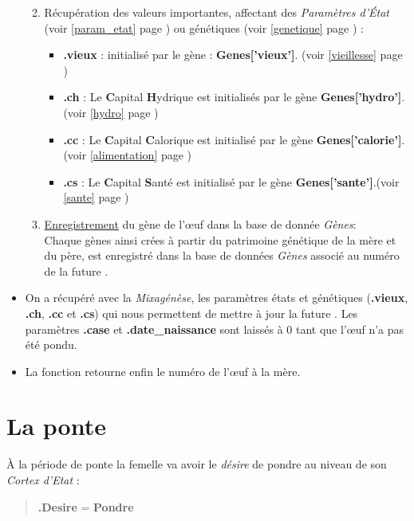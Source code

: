 \documentclass[french]{report}
\begin{document}
\begin{itemize}
\begin{enumerate}
\begin{quote}
		\end{quote}
		\item Récupération des valeurs importantes, affectant des \textit{Paramètres d’État} (voir \ref{param_etat} page \pageref{param_etat}) ou génétiques (voir \ref{genetique} page \pageref{genetique}) : \\
		\begin{itemize} 
			\item {\textbf{.vieux}} : initialisé par le gène : \textbf{Genes['vieux']}. (voir \ref{vieillesse} page \pageref{vieillesse})
			\item {\textbf{.ch}} : Le \textbf{C}apital \textbf{H}ydrique est initialisés par le gène \textbf{Genes['hydro']}.(voir \ref{hydro} page \pageref{hydro})
			\item {\textbf{.cc}} : Le \textbf{C}apital \textbf{C}alorique est initialisé par le gène \textbf{Genes['calorie']}.(voir \ref{alimentation} page \pageref{alimentation})
			\item {\textbf{.cs}} :  Le \textbf{C}apital \textbf{S}anté est initialisé par le gène \textbf{Genes['sante']}.(voir \ref{sante} page \pageref{sante})
		\end{itemize}
		\item \underline{Enregistrement} du gène de l’œuf dans la base de donnée \textit{Gènes}:\\
		Chaque gènes ainsi crées à partir du patrimoine génétique de la mère et du père, est enregistré dans la base de données \textit{Gènes} associé au numéro de la future \CoCiX.\\
		
	\end{enumerate}
	\item On a récupéré avec la \textit{Mixagénèse}, les paramètres états et génétiques (\textbf{.vieux}, \textbf{.ch}, \textbf{.cc} et \textbf{.cs}) qui nous permettent de mettre à jour la future \CoCiX.  Les paramètres \textbf{.case} et \textbf{.date\_naissance} sont laissés à 0 tant que l’œuf n'a pas été pondu.\\
	\item La fonction retourne enfin le numéro de l’œuf à la mère.\\
	
\end{itemize} 

\section{La ponte}\label{ponte}
À la période de ponte la femelle va avoir le \textit{désire} de pondre au niveau de son \textit{Cortex d'Etat} : \\
\begin{quote}
	\textbf{.Desire} = \textbf{Pondre}\\
\end{quote}
\end{document}
